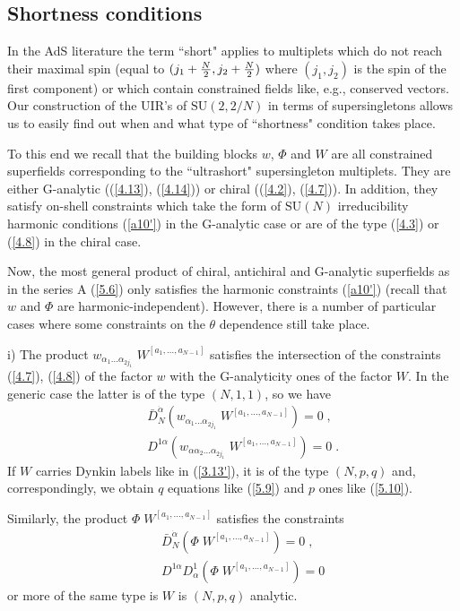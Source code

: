 \documentclass[a4paper,12pt]{article}
\begin{document}
\subsection{Shortness conditions}\label{shortening}

In the AdS literature the term ``short" applies to multiplets 
which do not reach their maximal spin (equal to $(j_1 + {N\over 
2}, j_2 + {N\over 2})$ where $(j_1,j_2)$ is the spin of the first 
component) or which contain constrained fields like, e.g., 
conserved vectors. Our construction of the UIR's of 
$\mbox{SU}(2,2/N)$ in terms of supersingletons allows us to easily 
find out when and what type of ``shortness" condition takes place. 

To this end we recall that the building blocks $w$, $\Phi$ and $W$ 
are all constrained superfields corresponding to the ``ultrashort" 
supersingleton multiplets. They are either G-analytic 
((\ref{4.13}), (\ref{4.14})) or chiral ((\ref{4.2}), (\ref{4.7})). 
In addition, they satisfy on-shell constraints which take the form 
of $\mbox{SU}(N)$ irreducibility harmonic conditions (\ref{a10'}) 
in the G-analytic case or are of the type (\ref{4.3}) or 
(\ref{4.8}) in the chiral case. 

Now, the most general product of chiral, antichiral and G-analytic 
superfields as in the series A (\ref{5.6}) only satisfies the 
harmonic constraints (\ref{a10'}) (recall that $w$ and $\Phi$ are 
harmonic-independent). However, there is a number of particular 
cases where some constraints on the $\theta$ dependence still take 
place. 

i) The product 
$w_{\alpha_1\ldots\alpha_{2j_1}}\;W^{[a_1,\ldots,a_{N-1}]}$  
satisfies the intersection of the constraints (\ref{4.7}), 
(\ref{4.8}) of the factor $w$ with the G-analyticity ones of the 
factor $W$. In the generic case the latter is of the type 
$(N,1,1)$, so we have 
\begin{eqnarray}
  &&\bar D^{\dot\alpha}_N 
(w_{\alpha_1\ldots\alpha_{2j_1}}\;W^{[a_1,\ldots,a_{N-1}]}) = 0\;, 
\label{5.9}\\ 
  && D^{1\alpha}(w_{\alpha\alpha_2\ldots\alpha_{2j_1}}\;W^{[a_1,\ldots,a_{N-1}]}) = 0\;.
 \label{5.10}
\end{eqnarray}
If $W$ carries Dynkin labels like in (\ref{3.13'}), it is of the 
type $(N,p,q)$ and, correspondingly, we obtain $q$ equations like 
(\ref{5.9}) and $p$ ones like (\ref{5.10}).

Similarly, the product $\Phi\;W^{[a_1,\ldots,a_{N-1}]}$ 
satisfies the constraints 
\begin{eqnarray}
  &&\bar D^{\dot\alpha}_N 
(\Phi\;W^{[a_1,\ldots,a_{N-1}]}) = 0\;, \label{5.11}\\ 
  && D^{1\alpha}D^1_\alpha(\Phi\;W^{[a_1,\ldots,a_{N-1}]}) = 0
 \label{5.12}
\end{eqnarray}
or more of the same type is $W$ is $(N,p,q)$ analytic.
\end{document}
